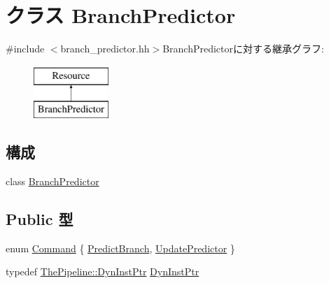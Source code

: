 \hypertarget{classBranchPredictor}{
\section{クラス BranchPredictor}
\label{classBranchPredictor}
}


{\ttfamily \#include $<$branch\_\-predictor.hh$>$}BranchPredictorに対する継承グラフ:\begin{figure}[H]
\begin{center}
\leavevmode
\includegraphics[height=2cm]{classBranchPredictor}
\end{center}
\end{figure}
\subsection*{構成}
\begin{DoxyCompactItemize}
\item 
class \hyperlink{classBranchPredictor_1_1BranchPredictor}{BranchPredictor}
\end{DoxyCompactItemize}
\subsection*{Public 型}
\begin{DoxyCompactItemize}
\item 
enum \hyperlink{classBranchPredictor_a2afce0a47a93eee73a314d53e4890153}{Command} \{ \hyperlink{classBranchPredictor_a2afce0a47a93eee73a314d53e4890153aec1c2cbeee4201814af6c741b088b95e}{PredictBranch}, 
\hyperlink{classBranchPredictor_a2afce0a47a93eee73a314d53e4890153a246fdcc5483f7878e46d4f5d80789b16}{UpdatePredictor}
 \}
\item 
typedef \hyperlink{classRefCountingPtr}{ThePipeline::DynInstPtr} \hyperlink{classBranchPredictor_af9d0c8a46736ba6aa2d8bb94da1a5e73}{DynInstPtr}
\end{DoxyCompactItemize}
